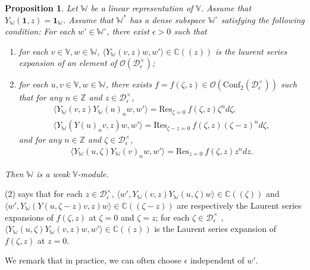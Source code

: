 \documentclass[12pt,a4paper,notitlepage]{report}
\theoremstyle{definition}
\theoremstyle{plain}
\newtheorem{pp}[df]{Proposition}
\newcommand{\mc}{\mathcal}
\newcommand{\id}{\mathbf{1}}
\newcommand{\Conf}{\mathrm{Conf}}
\newcommand{\Res}{\mathrm{Res}}
\newcommand{\bk}[1]{\langle {#1}\rangle}
\newcommand{\scr}{\mathscr}
\newcommand{\Vbb}{\mathbb V}
\newcommand{\Wbb}{\mathbb W}
\newcommand{\Cbb}{\mathbb C}
\newcommand{\Zbb}{\mathbb Z}
\numberwithin{equation}{section}
\begin{document}
\begin{pp}\label{lb94}
Let $\Wbb$ be a linear representation of $\Vbb$. Assume that  $Y_\Wbb(\id,z)=\id_\Wbb$. Assume  that $\Wbb^*$ has a dense subspace $\Wbb^\circ$ satisfying the following condition: For each $w'\in\Wbb^\circ$, there exist $\epsilon>0$ such that
\begin{enumerate}[label=(\arabic*)]
	\item for each $v\in\Vbb,w\in\Wbb$, $\bk{Y_\Wbb(v,z)w,w'}\in\Cbb((z))$ is the laurent series expansion of an element of $\scr O(\mc D_\epsilon^\times)$;
	\item for each $u,v\in\Vbb,w\in\Wbb$, there exists $f=f(\zeta,z)\in\scr O(\Conf_2(\mc D_\epsilon^\times))$ such that for any $n\in\Zbb$ and $z\in\mc D_\epsilon^\times$,
	\begin{gather}
		\bk{Y_\Wbb(v,z)Y_\Wbb(u)_nw,w'}=\Res_{\zeta=0}~f(\zeta,z)\zeta^nd\zeta,\label{eq193}\\
		\bk{Y_\Wbb(Y(u)_nv,z)w,w'}=\Res_{\zeta-z=0}~f(\zeta,z)(\zeta-z)^nd\zeta,\label{eq194}
	\end{gather}
	and for any $n\in\Zbb$ and $\zeta\in\mc D_\epsilon^\times$,
	\begin{gather}
		\bk{Y_\Wbb(u,\zeta)Y_\Wbb(v)_nw,w'}=\Res_{z=0}~f(\zeta,z)z^ndz.\label{eq195}
	\end{gather}
\end{enumerate}
Then $\Wbb$ is a weak $\Vbb$-module.
\end{pp}

(2) says that for each $z\in\mc D_\epsilon^\times$, $\bk{w',Y_\Wbb(v,z)Y_\Wbb(u,\zeta)w}\in\Cbb((\zeta))$ and $\bk{w',Y_\Wbb(Y(u,\zeta-z)v,z)w}\in\Cbb((\zeta-z))$ are respectively the Laurent series expansions of $f(\zeta,z)$ at $\zeta=0$ and $\zeta=z$; for each $\zeta\in\mc D_\epsilon^\times$
, $\bk{Y_\Wbb(u,\zeta)Y_\Wbb(v,z)w,w'}\in\Cbb((z))$ is the Laurent series expansion of $f(\zeta,z)$ at $z=0$.

We remark that in practice, we can often choose $\epsilon$ independent of $w'$.
\end{document}
